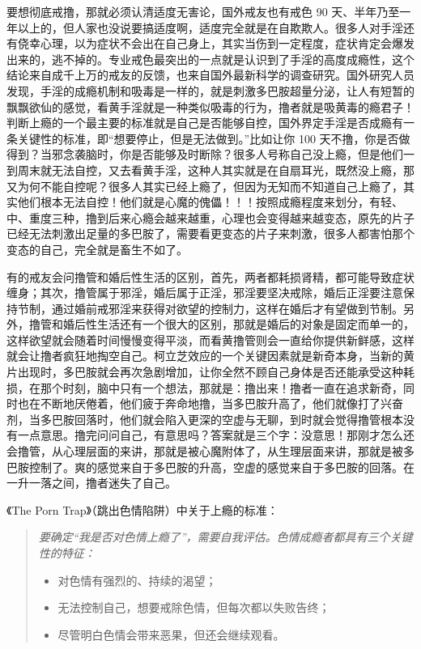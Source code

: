 要想彻底戒撸，那就必须认清适度无害论，国外戒友也有戒色 90 天、半年乃至一年以上的，但人家也没说要搞适度啊，适度完全就是在自欺欺人。很多人对手淫还有侥幸心理，以为症状不会出在自己身上，其实当伤到一定程度，症状肯定会爆发出来的，逃不掉的。专业戒色最突出的一点就是认识到了手淫的高度成瘾性，这个结论来自成千上万的戒友的反馈，也来自国外最新科学的调查研究。国外研究人员发现，手淫的成瘾机制和吸毒是一样的，就是刺激多巴胺超量分泌，让人有短暂的飘飘欲仙的感觉，看黄手淫就是一种类似吸毒的行为，撸者就是吸黄毒的瘾君子！判断上瘾的一个最主要的标准就是自己是否能够自控，国外界定手淫是否成瘾有一条关键性的标准，即“想要停止，但是无法做到。”比如让你 100 天不撸，你是否做得到？当邪念袭脑时，你是否能够及时断除？很多人号称自己没上瘾，但是他们一到周末就无法自控，又去看黄手淫，这种人其实就是在自扇耳光，既然没上瘾，那又为何不能自控呢？很多人其实已经上瘾了，但因为无知而不知道自己上瘾了，其实他们根本无法自控！他们就是心魔的傀儡！！！按照成瘾程度来划分，有轻、中、重度三种，撸到后来心瘾会越来越重，心理也会变得越来越变态，原先的片子已经无法刺激出足量的多巴胺了，需要看更变态的片子来刺激，很多人都害怕那个变态的自己，完全就是畜生不如了。

有的戒友会问撸管和婚后性生活的区别，首先，两者都耗损肾精，都可能导致症状缠身；其次，撸管属于邪淫，婚后属于正淫，邪淫要坚决戒除，婚后正淫要注意保持节制，通过婚前戒邪淫来获得对欲望的控制力，这样在婚后才有望做到节制。另外，撸管和婚后性生活还有一个很大的区别，那就是婚后的对象是固定而单一的，这样欲望就会随着时间慢慢变得平淡，而看黄撸管则会一直给你提供新鲜感，这样就会让撸者疯狂地掏空自己。柯立芝效应的一个关键因素就是新奇本身，当新的黄片出现时，多巴胺就会再次急剧增加，让你全然不顾自己身体是否还能承受这种耗损，在那个时刻，脑中只有一个想法，那就是：撸出来！撸者一直在追求新奇，同时也在不断地厌倦着，他们疲于奔命地撸，当多巴胺升高了，他们就像打了兴奋剂，当多巴胺回落时，他们就会陷入更深的空虚与无聊，到时就会觉得撸管根本没有一点意思。撸完问问自己，有意思吗？答案就是三个字：没意思！那刚才怎么还会撸管，从心理层面的来讲，那就是被心魔附体了，从生理层面来讲，那就是被多巴胺控制了。爽的感觉来自于多巴胺的升高，空虚的感觉来自于多巴胺的回落。在一升一落之间，撸者迷失了自己。

《The Porn Trap》（跳出色情陷阱）中关于上瘾的标准：

\begin{quotation}\it
    要确定“我是否对色情上瘾了”，需要自我评估。色情成瘾者都具有三个关键性的特征：\begin{itemize}
        \item 对色情有强烈的、持续的渴望；
        \item 无法控制自己，想要戒除色情，但每次都以失败告终；
        \item 尽管明白色情会带来恶果，但还会继续观看。
    \end{itemize}
\end{quotation}

